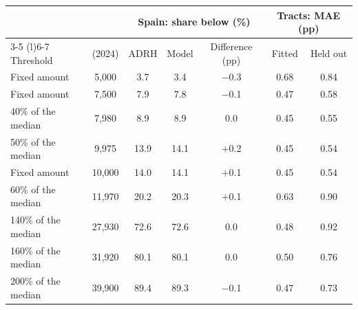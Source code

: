 \begin{tabular}{@{}lcccccc@{}}
\toprule
 & & \multicolumn{3}{c}{Spain: share below (\%)} & \multicolumn{2}{c}{Tracts: MAE (pp)} \\ \cmidrule(lr){3-5} \cmidrule(l){6-7}
Threshold & \texteuro{} (2024) & ADRH & Model & Difference (pp) & Fitted & Held out \\
\midrule
Fixed amount & 5,000 & 3.7 & 3.4 & $-$0.3 & 0.68 & 0.84 \\
Fixed amount & 7,500 & 7.9 & 7.8 & $-$0.1 & 0.47 & 0.58 \\
40\% of the median & 7,980 & 8.9 & 8.9 & 0.0 & 0.45 & 0.55 \\
50\% of the median & 9,975 & 13.9 & 14.1 & $+$0.2 & 0.45 & 0.54 \\
Fixed amount & 10,000 & 14.0 & 14.1 & $+$0.1 & 0.45 & 0.54 \\
60\% of the median & 11,970 & 20.2 & 20.3 & $+$0.1 & 0.63 & 0.90 \\
140\% of the median & 27,930 & 72.6 & 72.6 & 0.0 & 0.48 & 0.92 \\
160\% of the median & 31,920 & 80.1 & 80.1 & 0.0 & 0.50 & 0.76 \\
200\% of the median & 39,900 & 89.4 & 89.3 & $-$0.1 & 0.47 & 0.73 \\
\bottomrule
\end{tabular}
